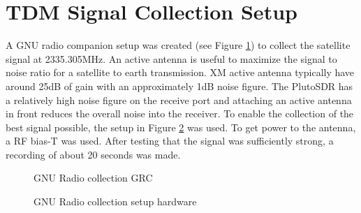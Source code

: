 \documentclass[conference,onecolumn]{IEEEtran}
\begin{document}
\section{TDM Signal Collection Setup}
A GNU radio companion setup was created (see Figure \ref{fig::gnu_collect}) to collect the satellite signal at 2335.305MHz.   An active antenna is useful to maximize the signal to noise ratio for a satellite to earth transmission.  XM active antenna typically have around 25dB of gain with an approximately 1dB  noise figure.  The PlutoSDR has a relatively high noise figure on the receive port and attaching an active antenna in front reduces the overall noise into the receiver.  To enable the collection of the best signal possible, the setup in Figure \ref{fig::gnu_hardware} was used.  To get power to the antenna, a RF bias-T was used.  After testing that the signal was sufficiently strong, a recording of about 20 seconds was made.
\begin{figure}[H]
	\centerline{}
	\caption{GNU Radio collection GRC}
	\label{fig::gnu_collect}
\end{figure}
\begin{figure}[H]
	\centerline{}
	\caption{GNU Radio collection setup hardware}
	\label{fig::gnu_hardware}
\end{figure}
\end{document}
